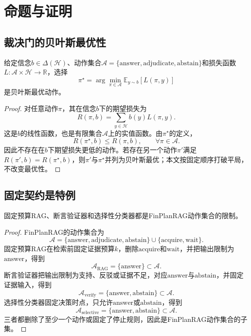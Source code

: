 \chapter{命题与证明}

\section{裁决门的贝叶斯最优性}

\begin{proposition}
给定信念$b\in\Delta(\mathcal H)$、动作集合$\mathcal A=\{\text{answer},\text{adjudicate},\text{abstain}\}$和损失函数$L:\mathcal A\times\mathcal H\to\mathbb R$，选择
\[
\pi^\star=\arg\min_{\pi\in\mathcal A}\mathbb E_{y\sim b}[L(\pi,y)]
\]
是贝叶斯最优动作。
\end{proposition}

\begin{proof}
对任意动作$\pi$，其在信念$b$下的期望损失为
\[
R(\pi,b)=\sum_{y\in\mathcal H}b(y)L(\pi,y).
\]
这是$b$的线性函数，也是有限集合$\mathcal A$上的实值函数。由$\pi^\star$的定义，
\[
R(\pi^\star,b)\le R(\pi,b),\qquad \forall \pi\in\mathcal A.
\]
因此不存在在$b$下期望损失更低的动作。若存在另一个动作$\pi'$满足$R(\pi',b)=R(\pi^\star,b)$，则$\pi'$与$\pi^\star$并列为贝叶斯最优；本文按固定顺序打破平局，不改变最优性。
\end{proof}

\section{固定契约是特例}

\begin{proposition}
固定预算RAG、断言验证器和选择性分类器都是FinPlanRAG动作集合的限制。
\end{proposition}

\begin{proof}
FinPlanRAG的动作集合为
\[
\mathcal A=\{\text{answer},\text{adjudicate},\text{abstain}\}\cup\{\text{acquire},\text{wait}\}.
\]
固定预算RAG在检索前固定证据预算$k$，删除$\text{acquire}$和$\text{wait}$，并把输出限制为$\text{answer}$，得到
\[
\mathcal A_{\text{RAG}}=\{\text{answer}\}\subset\mathcal A.
\]
断言验证器把输出限制为支持、反驳或证据不足，对应$\text{answer}$与$\text{abstain}$，并固定证据输入，得到
\[
\mathcal A_{\text{verify}}=\{\text{answer},\text{abstain}\}\subset\mathcal A.
\]
选择性分类器固定决策时点，只允许$\text{answer}$或$\text{abstain}$，得到
\[
\mathcal A_{\text{selective}}=\{\text{answer},\text{abstain}\}\subset\mathcal A.
\]
三者都删除了至少一个动作或固定了停止规则，因此是FinPlanRAG动作集合的子集。
\end{proof}

